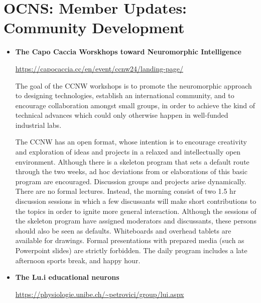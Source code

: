 \section*{OCNS: Member Updates: Community Development}%

\begin{itemize}
    \item \textbf{The Capo Caccia Worskhops toward Neuromorphic Intelligence}

        \url{https://capocaccia.cc/en/event/ccnw24/landing-page/}

        The goal of the CCNW workshops is to promote the neuromorphic approach to designing technologies, establish an international community, and to encourage collaboration amongst small groups, in order to achieve the kind of technical advances which could only otherwise happen in well-funded industrial labs.

        The CCNW has an open format, whose intention is to encourage creativity and exploration of ideas and projects in a relaxed and intellectually open environment. Although there is a skeleton program that sets a default route through the two weeks, ad hoc deviations from or elaborations of this basic program are encouraged. Discussion groups and projects arise dynamically. There are no formal lectures. Instead, the morning consist of two 1.5 hr discussion sessions in which a few discussants will make short contributions to the topics in order to ignite more general interaction. Although the sessions of the skeleton program have assigned moderators and discussants, these persons should also be seen as defaults. Whiteboards and overhead tablets are available for drawings. Formal presentations with prepared media (such as Powerpoint slides) are strictly forbidden. The daily program includes a late afternoon sports break, and happy hour.

    \item \textbf{The Lu.i educational neurons}

        \url{https://physiologie.unibe.ch/~petrovici/group/lui.aspx}


\end{itemize}
